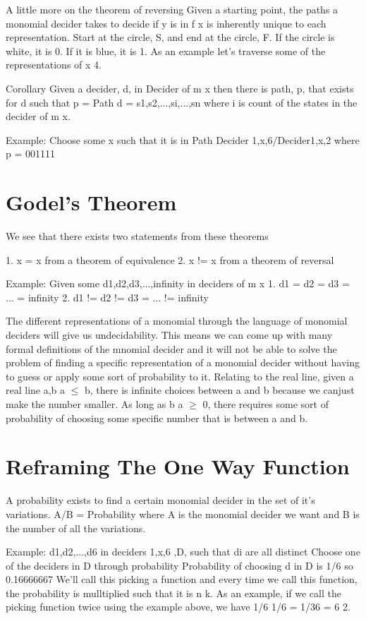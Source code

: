 A little more on the theorem of reversing
Given a starting point, the paths a monomial decider takes to decide if y is in f x is inherently unique to each representation. Start at the circle, S, and end at the circle, F. If the circle is white, it is 0. If it is blue, it is 1. As an example let's traverse some of the representations of x 4.

Corollary
Given a decider, d, in Decider of m x then there is path, p, that exists for d such that p = Path d = s1,s2,...,si,...,sn where i is count of the states in the decider of m x.

Example:
Choose some x such that it is in Path Decider 1,x,6/Decider1,x,2 where p = 001111

\section{Godel's Theorem}

We see that there exists two statements from these theorems

1. x = x from a theorem of equivalence
2. x != x from a theorem of reversal


Example:
Given some d1,d2,d3,...,infinity in deciders of m x
1. d1 = d2 = d3 = ... = infinity
2. d1 != d2 != d3 = ... != infinity

The different representations of a monomial through the language of monomial deciders will give us undecidability. This means we can come up with many formal definitions of the mnomial decider and it will not be able to solve the problem of finding a specific representation of a monomial decider without having to guess or apply some sort of probability to it. Relating to the real line, given a real line a,b a $\leq$ b, there is infinite choices between a and b because we canjust make the number smaller. As long as b  a $\geq $ 0, there requires some sort of probability of choosing some specific number that is between a and b.

\section{Reframing The One Way Function}

A probability exists to find a certain monomial decider in the set of it's variations. A/B = Probability where A is the monomial decider we want and B is the number of all the variations.

Example:
d1,d2,...,d6 in deciders 1,x,6 ,D, such that di are all distinct
Choose one of the deciders in D through probability
Probability of choosing d in D is 1/6 so 0.16666667
We'll call this picking a function and every time we call this function, the probability is mulltiplied such that it is n k. As an example, if we call the picking function twice using the example above, we have 1/6 1/6 = 1/36 = 6 2.

